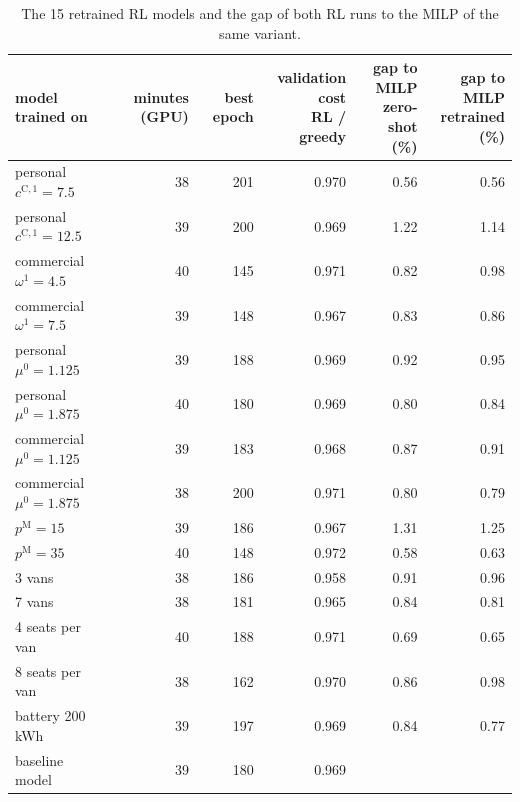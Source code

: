 \begin{table}[H]\centering
\small
\caption{The 15 retrained RL models and the gap of both RL runs to the MILP of the same variant.}\label{tab:retrain}
\begin{adjustbox}{max width=\textwidth}\begin{tabular}{lrrrrr}\toprule
model trained on & minutes (GPU) & best epoch & \shortstack{validation cost\\RL / greedy} & \shortstack{gap to MILP\\zero-shot (\%)} & \shortstack{gap to MILP\\retrained (\%)} \\ \midrule
personal $c^{\mathrm C,1}=7.5$ & 38 & 201 & 0.970 & 0.56 & 0.56 \\
personal $c^{\mathrm C,1}=12.5$ & 39 & 200 & 0.969 & 1.22 & 1.14 \\
commercial $\omega^{1}=4.5$ & 40 & 145 & 0.971 & 0.82 & 0.98 \\
commercial $\omega^{1}=7.5$ & 39 & 148 & 0.967 & 0.83 & 0.86 \\
personal $\mu^{0}=1.125$ & 39 & 188 & 0.969 & 0.92 & 0.95 \\
personal $\mu^{0}=1.875$ & 40 & 180 & 0.969 & 0.80 & 0.84 \\
commercial $\mu^{0}=1.125$ & 39 & 183 & 0.968 & 0.87 & 0.91 \\
commercial $\mu^{0}=1.875$ & 38 & 200 & 0.971 & 0.80 & 0.79 \\
$p^{\mathrm M}=15$ & 39 & 186 & 0.967 & 1.31 & 1.25 \\
$p^{\mathrm M}=35$ & 40 & 148 & 0.972 & 0.58 & 0.63 \\
3 vans & 38 & 186 & 0.958 & 0.91 & 0.96 \\
7 vans & 38 & 181 & 0.965 & 0.84 & 0.81 \\
4 seats per van & 40 & 188 & 0.971 & 0.69 & 0.65 \\
8 seats per van & 38 & 162 & 0.970 & 0.86 & 0.98 \\
battery 200 kWh & 39 & 197 & 0.969 & 0.84 & 0.77 \\
baseline model & 39 & 180 & 0.969 &  &  \\
\bottomrule\end{tabular}\end{adjustbox}\end{table}
